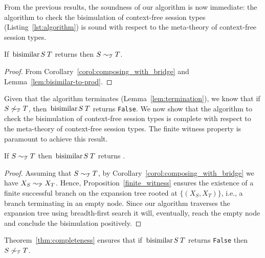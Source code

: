 From the previous results, the soundness of our algorithm is now
immediate: the algorithm to check the bisimulation of context-free
session types (Listing~\ref{lst:algorithm}) is sound with respect to
the meta-theory of context-free session types.

\begin{theorem}[Soundness]
\label{thm:soundness}
  If $\bisimf ST$ returns  then $S\sim_\mathcal T T$.
\end{theorem}
%
\begin{proof}
  From Corollary~\ref{corol:composing_with_bridge} and
  Lemma~\ref{lem:bisimilar-to-prod}.
\end{proof}

 
Given that the algorithm terminates (Lemma~\ref{lem:termination}), we
know that if $S\not\sim_\mathcal T T$, then $\bisimf ST$ returns
\lstinline|False|.
%
We now show that the algorithm to check the bisimulation of context-free session 
types is complete with respect to the meta-theory of context-free session
types. The finite witness property is paramount to achieve this result.

\begin{theorem}[Completeness]
\label{thm:completeness}
  If $S \sim_\mathcal T T$ then $\bisimf S T$ returns
  .
\end{theorem}
%
\begin{proof}
  Assuming that $S \sim_\mathcal T T$, by Corollary~\ref{corol:composing_with_bridge}
  we have $X_{S} \sim_\mathcal P X_{T}$.  Hence, Proposition~\ref{finite_witness}
  ensures the existence of a finite successful branch on the
  expansion tree rooted at $\{(X_{S},X_{T})\}$, i.e., a branch
  terminating in an empty node.  Since our algorithm traverses the
  expansion tree using breadth-first search it will, eventually, reach
  the empty node and conclude the bisimulation positively.
\end{proof}

Theorem~\ref{thm:completeness} ensures that if $\bisimf S T$ returns
  \lstinline|False| then $S \not\sim_\mathcal T T$.


